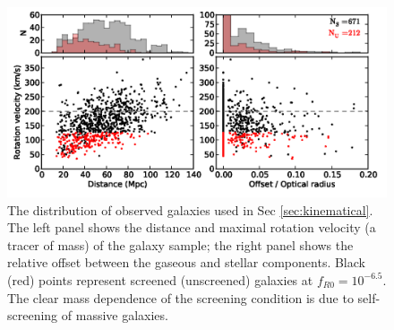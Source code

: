 \documentclass[useAMS,usenatbib,twocolumn]{mn2e}
\begin{document}


\begin{figure}
\begin{center}
  \includegraphics[scale=0.3]{figures/sec4_2_scatter.png}
  \caption{The distribution of observed galaxies used in Sec
    \ref{sec:kinematical}.  The left panel shows the distance and maximal
    rotation velocity (a tracer of mass) of the galaxy sample; the right
    panel shows the relative offset between the gaseous and stellar components.
    Black (red) points represent screened (unscreened) galaxies at
    $f_{R0} = 10^{-6.5}$.  The clear mass dependence of the screening condition
    is due to self-screening of massive galaxies.}
  \label{offset-kin-den-1}
\end{center}
\end{figure}
\end{document}
